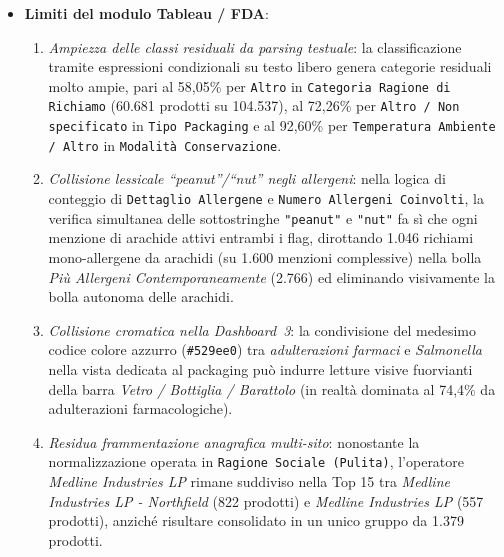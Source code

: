 \begin{itemize}
    \item \textbf{Limiti del modulo Tableau / FDA}:
    \begin{enumerate}
        \item \textit{Ampiezza delle classi residuali da parsing testuale}: la classificazione tramite espressioni condizionali su testo libero genera categorie residuali molto ampie, pari al 58,05\% per \texttt{Altro} in \texttt{Categoria Ragione di Richiamo} (60.681 prodotti su 104.537), al 72,26\% per \texttt{Altro / Non specificato} in \texttt{Tipo Packaging} e al 92,60\% per \texttt{Temperatura Ambiente / Altro} in \texttt{Modalità Conservazione}.
        \item \textit{Collisione lessicale ``peanut''/``nut'' negli allergeni}: nella logica di conteggio di \texttt{Dettaglio Allergene} e \texttt{Numero Allergeni Coinvolti}, la verifica simultanea delle sottostringhe \texttt{"peanut"} e \texttt{"nut"} fa sì che ogni menzione di arachide attivi entrambi i flag, dirottando 1.046 richiami mono-allergene da arachidi (su 1.600 menzioni complessive) nella bolla \textit{Più Allergeni Contemporaneamente} (2.766) ed eliminando visivamente la bolla autonoma delle arachidi.
        \item \textit{Collisione cromatica nella Dashboard~3}: la condivisione del medesimo codice colore azzurro (\texttt{\#529ee0}) tra \textit{adulterazioni farmaci} e \textit{Salmonella} nella vista dedicata al packaging può indurre letture visive fuorvianti della barra \textit{Vetro / Bottiglia / Barattolo} (in realtà dominata al 74,4\% da adulterazioni farmacologiche).
        \item \textit{Residua frammentazione anagrafica multi-sito}: nonostante la normalizzazione operata in \texttt{Ragione Sociale (Pulita)}, l'operatore \textit{Medline Industries LP} rimane suddiviso nella Top 15 tra \textit{Medline Industries LP - Northfield} (822 prodotti) e \textit{Medline Industries LP} (557 prodotti), anziché risultare consolidato in un unico gruppo da 1.379 prodotti.
    \end{enumerate}


\end{itemize}
